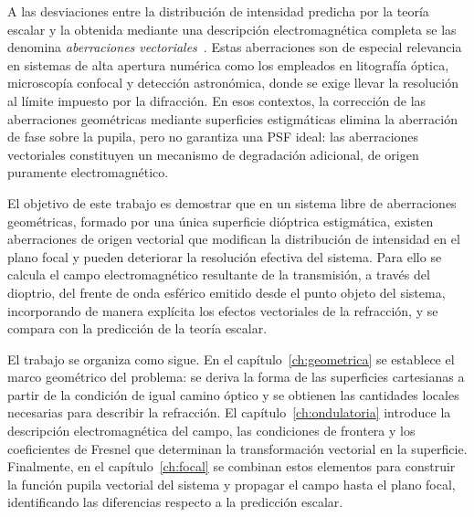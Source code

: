 A las desviaciones entre la distribución de intensidad predicha por la teoría escalar y la obtenida mediante una descripción electromagnética completa se las denomina \emph{aberraciones vectoriales}~\cite{Shen2022,Ma2025}. Estas aberraciones son de especial relevancia en sistemas de alta apertura numérica como los empleados en litografía óptica, microscopía confocal y detección astronómica, donde se exige llevar la resolución al límite impuesto por la difracción. En esos contextos, la corrección de las aberraciones geométricas mediante superficies estigmáticas elimina la aberración de fase sobre la pupila, pero no garantiza una PSF ideal: las aberraciones vectoriales constituyen un mecanismo de degradación adicional, de origen puramente electromagnético.

El objetivo de este trabajo es demostrar que en un sistema libre de aberraciones geométricas, formado por una única superficie dióptrica estigmática, existen aberraciones de origen vectorial que modifican la distribución de intensidad en el plano focal y pueden deteriorar la resolución efectiva del sistema. Para ello se calcula el campo electromagnético resultante de la transmisión, a través del dioptrio, del frente de onda esférico emitido desde el punto objeto del sistema, incorporando de manera explícita los efectos vectoriales de la refracción, y se compara con la predicción de la teoría escalar.

El trabajo se organiza como sigue. En el capítulo~\ref{ch:geometrica} se establece el marco geométrico del problema: se deriva la forma de las superficies cartesianas a partir de la condición de igual camino óptico y se obtienen las cantidades locales necesarias para describir la refracción. El capítulo~\ref{ch:ondulatoria} introduce la descripción electromagnética del campo, las condiciones de frontera y los coeficientes de Fresnel que determinan la transformación vectorial en la superficie. Finalmente, en el capítulo~\ref{ch:focal} se combinan estos elementos para construir la función pupila vectorial del sistema y propagar el campo hasta el plano focal, identificando las diferencias respecto a la predicción escalar.

